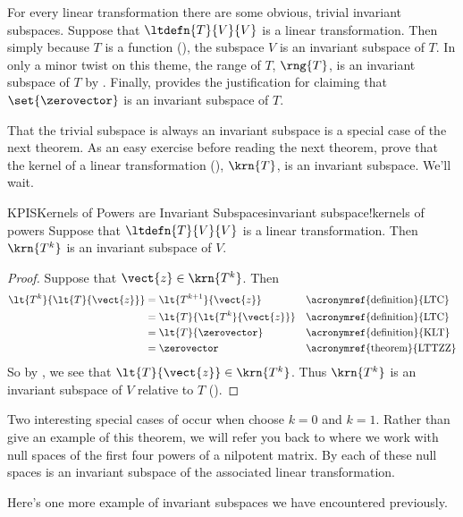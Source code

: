 %
For every linear transformation there are some obvious, trivial invariant subspaces.  Suppose that $\ltdefn{T}{V}{V}$ is a linear transformation.  Then simply because $T$ is a function (), the subspace $V$ is an invariant subspace of $T$.  In only a minor twist on this theme, the range of $T$, $\rng{T}$, is an invariant subspace of $T$ by .  Finally,  provides the justification for claiming that $\set{\zerovector}$ is an invariant subspace of $T$.\par
%
That the trivial subspace is always an invariant subspace is a special case of the next theorem.  As an easy exercise before reading the next theorem, prove that the kernel of a linear transformation (), $\krn{T}$, is an invariant subspace.  We'll wait.
%
\begin{theorem}{KPIS}{Kernels of Powers are Invariant Subspaces}{invariant subspace!kernels of powers}
Suppose that $\ltdefn{T}{V}{V}$ is a linear transformation.  Then $\krn{T^k}$ is an invariant subspace of $V$.
\end{theorem}
%
\begin{proof}
Suppose that $\vect{z}\in\krn{T^k}$.  Then
%
\begin{align*}
\lt{T^k}{\lt{T}{\vect{z}}}
&=\lt{T^{k+1}}{\vect{z}}&&\text{\acronymref{definition}{LTC}}\\
&=\lt{T}{\lt{T^k}{\vect{z}}}&&\text{\acronymref{definition}{LTC}}\\
&=\lt{T}{\zerovector}&&\text{\acronymref{definition}{KLT}}\\
&=\zerovector&&\text{\acronymref{theorem}{LTTZZ}}
\end{align*}
%
So by , we see that $\lt{T}{\vect{z}}\in\krn{T^k}$.  Thus $\krn{T^k}$ is an invariant subspace of $V$ relative to $T$ ().
%
\end{proof}
%
Two interesting special cases of   occur when choose $k=0$ and $k=1$.  Rather than give an example of this theorem, we will refer you back to  where we work with null spaces of the first four powers of a nilpotent matrix.  By  each of these null spaces is an invariant subspace of the associated linear transformation.\par
%
Here's one more example of invariant subspaces we have encountered previously.
%
